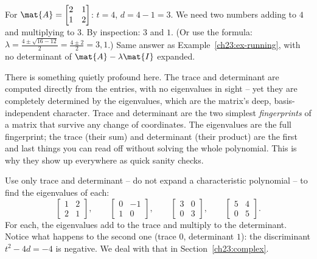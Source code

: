 \begin{example}
\label{ch23:ex-tracedet}
For $\mat{A}=\begin{bmatrix}2&1\\1&2\end{bmatrix}$: $t=4$, $d=4-1=3$. We need two
numbers adding to $4$ and multiplying to $3$. By inspection: $3$ and $1$. (Or use
the formula: $\lambda=\tfrac{4\pm\sqrt{16-12}}{2}=\tfrac{4\pm 2}{2}=3,1$.) Same
answer as Example~\ref{ch23:ex-running}, with no determinant of $\mat{A}-\lambda\mat{I}$
expanded.
\end{example}

\begin{aestheticbox}
There is something quietly profound here. The trace and determinant are computed
directly from the entries, with no eigenvalues in sight -- yet they are completely
determined by the eigenvalues, which are the matrix's deep, basis-independent
character. Trace and determinant are the two simplest \emph{fingerprints} of a
matrix that survive any change of coordinates. The eigenvalues are the full
fingerprint; the trace (their sum) and determinant (their product) are the first
and last things you can read off without solving the whole polynomial. This is why
they show up everywhere as quick sanity checks.
\end{aestheticbox}

\begin{labbox}
Use only trace and determinant -- do not expand a characteristic polynomial -- to
find the eigenvalues of each:
\[
  \begin{bmatrix}1&2\\2&1\end{bmatrix},\qquad
  \begin{bmatrix}0&-1\\1&0\end{bmatrix},\qquad
  \begin{bmatrix}3&0\\0&3\end{bmatrix},\qquad
  \begin{bmatrix}5&4\\0&5\end{bmatrix}.
\]
For each, the eigenvalues add to the trace and multiply to the determinant. Notice
what happens to the second one (trace $0$, determinant $1$): the discriminant
$t^2-4d=-4$ is negative. We deal with that in Section~\ref{ch23:complex}.
\end{labbox}

